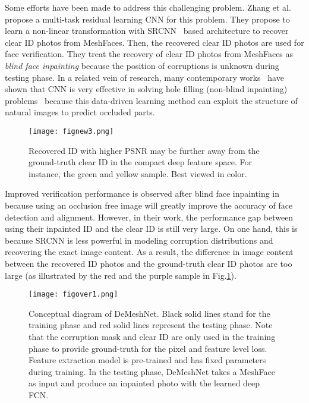 \documentclass[10pt,twocolumn,letterpaper]{article}
\begin{document}
Some efforts have been made to address this challenging problem. Zhang et al.~\cite{7550058} propose a multi-task residual learning CNN for this problem. They propose to learn a non-linear transformation with SRCNN~\cite{dong2014learning} based architecture to recover clear ID photos from MeshFaces. Then, the recovered clear ID photos are used for face verification. They treat the recovery of clear ID photos from MeshFaces as \textit{blind face inpainting} because the position of corruptions is unknown during testing phase. In a related vein of research, many contemporary works~\cite{mao2016image,Pathak_2016_CVPR,ren2015shepard,xie2012image} have shown that CNN is very effective in solving hole filling (non-blind inpainting) problems~\cite{criminisi2004region} because this data-driven learning method can exploit the structure of natural images to predict occluded parts.
\begin{figure}
  \centering
    \texttt{[image: fignew3.png]}
    \caption{%
Recovered ID with higher PSNR may be further away from the ground-truth clear ID in the compact deep feature space. For instance, the green and yellow sample. Best viewed in color.}
    \label{fig:insight} %
\end{figure}

Improved verification performance is observed after blind face inpainting in~\cite{7550058} because using an occlusion free image will greatly improve the accuracy of face detection and alignment. However, in their work, the performance gap between using their inpainted ID and the clear ID is still very large. On one hand, this is because SRCNN is less powerful in modeling corruption distributions and recovering the exact image content. As a result, the difference in image content between the recovered ID photos and the ground-truth clear ID photos are too large (as illustrated by the red and the purple sample in Fig.\ref{fig:insight}).

\begin{figure*}
  \centering
    \texttt{[image: figover1.png]}
    \caption{Conceptual diagram of DeMeshNet. Black solid lines stand for the training phase and red solid lines represent the testing phase. Note that the corruption mask and clear ID are only used in the training phase to provide ground-truth for the pixel and feature level loss. Feature extraction model is pre-trained and has fixed parameters during training. In the testing phase, DeMeshNet takes a MeshFace as input and produce an inpainted photo with the learned deep FCN.}
    \label{fig:overview} %
\end{figure*}
\end{document}
